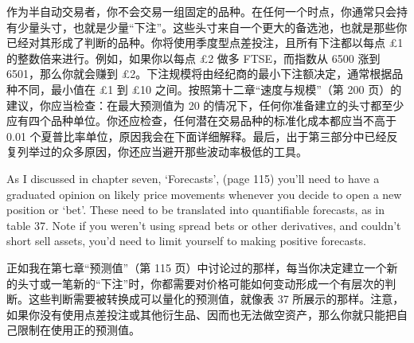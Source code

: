 \begin{chineseblock}作为半自动交易者，你不会交易一组固定的品种。在任何一个时点，你通常只会持有少量头寸，也就是少量“下注”。这些头寸来自一个更大的备选池，也就是那些你已经对其形成了判断的品种。你将使用季度型点差投注，且所有下注都以每点 £1 的整数倍来进行。例如，如果你以每点 £2 做多 FTSE，而指数从 6500 涨到 6501，那么你就会赚到 £2。下注规模将由经纪商的最小下注额决定，通常根据品种不同，最小值在 £1 到 £10 之间。按照第十二章“速度与规模”（第 200 页）的建议，你应当检查：在最大预测值为 20 的情况下，任何你准备建立的头寸都至少应有四个品种单位。你还应检查，任何潜在交易品种的标准化成本都应当不高于 0.01 个夏普比率单位，原因我会在下面详细解释。最后，出于第三部分中已经反复列举过的众多原因，你还应当避开那些波动率极低的工具。\end{chineseblock}


\begin{englishblock} As I discussed in chapter seven, ‘Forecasts', (page 115) you'll need to have a graduated opinion on likely price movements whenever you decide to open a new position or ‘bet'. These need to be translated into quantifiable forecasts, as in table 37. Note if you weren't using spread bets or other derivatives, and couldn't short sell assets, you'd need to limit yourself to making positive forecasts. \end{englishblock}

\begin{chineseblock}正如我在第七章“预测值”（第 115 页）中讨论过的那样，每当你决定建立一个新的头寸或一笔新的“下注”时，你都需要对价格可能如何变动形成一个有层次的判断。这些判断需要被转换成可以量化的预测值，就像表 37 所展示的那样。注意，如果你没有使用点差投注或其他衍生品、因而也无法做空资产，那么你就只能把自己限制在使用正的预测值。\end{chineseblock}

\begin{chinesetableblock}  \begingroup \small \setlength{\tabcolsep}{2pt} \renewcommand{\arraystretch}{1.15}
\noindent{}
\endgroup \end{chinesetableblock}

